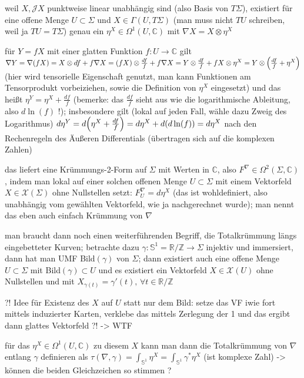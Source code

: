 \documentclass[../H_Analysis_main.tex]{subfiles}
\begin{document}
weil $X, \mathcal{J}X$ punktweise linear unabhängig sind (also Basis von $T\Sigma$), existiert für eine offene Menge $U \subset \Sigma$ und $X \in \Gamma(U, T\Sigma)$ (man muss nicht $TU$ schreiben, weil ja $TU = T\Sigma$) genau ein $\eta^X \in \Omega^1(U, \mathbb{C})$ mit $\nabla X = X \otimes \eta^X$

für  $Y = f X$ mit einer glatten Funktion $f: U \rightarrow \mathbb{C}$ gilt $\nabla Y = \nabla(f X) = X \otimes df + f \nabla X = \qty(f X) \otimes \frac{df}{f} + f \nabla X = Y \otimes \frac{df}{f} + f X \otimes \eta^X = Y \otimes \qty(\frac{df}{f} + \eta^X)$ (hier wird tensorielle Eigenschaft genutzt, man kann Funktionen am Tensorprodukt vorbeiziehen, sowie die Definition von $\eta^X$ eingesetzt) und das heißt $\eta^Y = \eta^X + \frac{df}{f}$ (bemerke: das $\frac{df}{f}$ sieht aus wie die logarithmische Ableitung, also $d\ln(f)$ !); insbesondere gilt (lokal auf jeden Fall, wähle dazu Zweig des Logarithmus) $d\eta^Y = d\qty(\eta^X + \frac{df}{f}) = d\eta^X + d\qty(d\ln(f)) = d\eta^X$ nach den Rechenregeln des Äußeren Differentials (übertragen sich auf die komplexen Zahlen)

das liefert eine Krümmungs-2-Form auf $\Sigma$ mit Werten in $\mathbb{C}$, also $F^\nabla \in \Omega^2(\Sigma, \mathbb{C})$, indem man lokal auf einer solchen offenen Menge $U \subset \Sigma$ mit einem Vektorfeld $X \in \mathcal{X}(\Sigma)$ ohne Nullstellen setzt: $F^\nabla_U = d\eta^X$ (das ist wohldefiniert, also unabhängig vom gewählten Vektorfeld, wie ja nachgerechnet wurde); man nennt das eben auch einfach Krümmung von $\nabla$


man braucht dann noch einen weiterführenden Begriff, die Totalkrümmung längs eingebetteter Kurven; betrachte dazu $\gamma: \mathbb{S}^1 = \mathbb{R}/ \mathbb{Z} \rightarrow \Sigma$ injektiv und immersiert, dann hat man UMF Bild$(\gamma)$ von $\Sigma$; dann existiert auch eine offene Menge $U \subset \Sigma$ mit Bild$(\gamma) \subset U$ und es existiert ein Vektorfeld $X \in \mathcal{X}(U)$ ohne Nullstellen und mit $X_{\gamma(t)} = \gamma'(t), \, \forall t \in \mathbb{R}/ \mathbb{Z}$

?! Idee für Existenz des $X$ auf $U$ statt nur dem Bild: setze das VF iwie fort mittels induzierter Karten, verklebe das mittels Zerlegung der 1 und das ergibt dann glattes Vektorfeld ?! -> WTF

für das $\eta^X \in \Omega^1(U, \mathbb{C})$ zu diesem $X$ kann man dann die Totalkrümmung von $\nabla$ entlang $\gamma$ definieren als $\tau(\nabla, \gamma) = \int_{\mathbb{S}^1} \eta^X = \int_{\mathbb{S}^1} \gamma^*\eta^X$ (ist komplexe Zahl) -> können die beiden Gleichzeichen so stimmen ?
\end{document}
